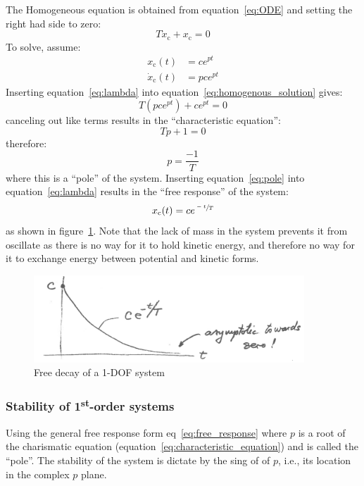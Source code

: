\documentclass[12pt,letter]{article}
\numberwithin{ex}{section} %
\numberwithin{re}{section} %
\numberwithin{equation}{section}	%
\begin{document}
The Homogeneous equation is obtained from equation~\ref{eq:ODE} and setting the right had side to zero:
\begin{equation}
T\dot{x}_\text{c} + x_\text{c} = 0
\label{eq:homogenous_solution}
\end{equation}
To solve, assume: 
\begin{align}
\label{eq:lambda}
x_\text{c}(t) &= c e^{ p t} \\
\dot{x}_\text{c}(t) &= p c e^{ p t} \nonumber
\end{align}
Inserting equation~\ref{eq:lambda} into equation~\ref{eq:homogenous_solution} gives:
\begin{equation}
T (p c e^{ p t}) + c e^{ p t} = 0
\end{equation}
canceling out like terms results in the ``characteristic equation'':
\begin{equation}
T p  + 1 = 0
\label{eq:characteristic_equation}
\end{equation}
therefore:
\begin{equation}
p  = \frac{-1}{T}
\label{eq:pole}
\end{equation}
where this is a ``pole'' of the system. Inserting equation~\ref{eq:pole} into equation~\ref{eq:lambda} results in the ``free response'' of the system:
\begin{equation}
\label{eq:free_response}
x_\text{c}(t) = c e^{ \sfrac{-t}{T}}
\end{equation}
as shown in figure~\ref{fig:1-DOF_free_decay}. Note that the lack of mass in the system prevents it from oscillate as there is no way for it to hold kinetic energy, and therefore no way for it to exchange energy between potential and kinetic forms. 
\begin{figure}[H]
	\centering
	\includegraphics[width=4in]{../figures/free_decay.png}
	\caption{Free decay of a 1-DOF system}
	\label{fig:1-DOF_free_decay}
\end{figure}

\subsubsection{Stability of 1\textsuperscript{st}-order systems}
Using the general free response form eq~\ref{eq:free_response} where $p$ is a root of the charismatic equation (equation~\ref{eq:characteristic_equation}) and is called the ``pole''. The stability of the system is dictate by the sing of of $p$, i.e., its location in the complex $p$ plane.
\end{document}
